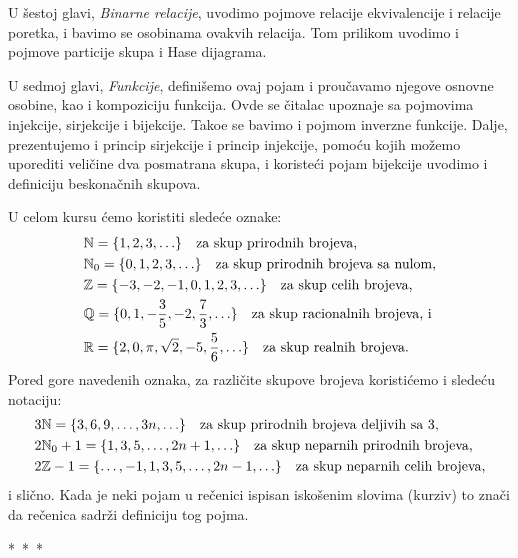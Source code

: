 U \v sestoj glavi, {\it Binarne relacije}, uvodimo pojmove relacije ekvivalencije i relacije poretka, i bavimo se osobinama ovakvih relacija. Tom prilikom uvodimo i pojmove particije skupa i Hase dijagrama.

U sedmoj glavi, {\it Funkcije}, defini\v semo ovaj pojam i prou\v cavamo njegove osnovne osobine, kao i kompoziciju funkcija. Ovde se \v citalac upoznaje sa pojmovima injekcije, sirjekcije i bijekcije. Tako\dj e se bavimo i pojmom inverzne funkcije. Dalje, prezentujemo i princip sirjekcije i princip injekcije, pomo\' cu kojih mo\v zemo uporediti veli\v cine dva posmatrana skupa, i koriste\' ci pojam bijekcije uvodimo i definiciju beskona\v cnih skupova.



\bigskip

U celom kursu \'cemo koristiti slede\'ce oznake:
\begin{align*}
    &\mathbb{N}          = \{1, 2, 3, \ldots\} \text{\quad za skup prirodnih brojeva,}\\
    &\mathbb{N}_0        = \{0, 1, 2, 3, \ldots\} \text{\quad za skup prirodnih brojeva sa nulom,}\\
    &\mathbb{Z}        = \{-3,-2,-1,0, 1, 2, 3, \ldots\} \text{\quad za skup celih brojeva,}\\
    &\mathbb{Q}        = \{0, 1,-\frac 35, -2, \frac 73, \ldots\} \text{\quad za skup racionalnih brojeva, i}\\
    &\mathbb{R}        = \{2,0,\pi, \sqrt 2, -5, \frac 56, \ldots\} \text{\quad za skup realnih brojeva.}
\end{align*}
Pored gore navedenih oznaka, za razli\v cite skupove brojeva koristi\' cemo i slede\' cu notaciju:
\begin{align*}
    &3\mathbb{N}          = \{3,6,9, \ldots,3n,\ldots\} \text{\quad za skup prirodnih brojeva deljivih sa $3$,}\\
    &2\mathbb{N}_0+1       = \{1,3,5, \ldots,2n+1,\ldots\} \text{\quad za skup neparnih prirodnih brojeva,}\\
    &2\mathbb{Z}-1        = \{\ldots,-1,1,3, 5, \ldots,2n-1,\ldots\} \text{\quad za skup neparnih celih brojeva,}
\end{align*}
i sli\v cno. Kada je neki pojam u re\v cenici ispisan isko\v senim slovima (kurziv) to zna\v ci da re\v cenica sadr\v zi definiciju tog pojma.

\begin{center}
*~*~*
\end{center}

